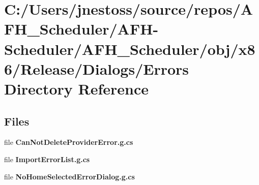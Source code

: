 \section{C\+:/\+Users/jnestoss/source/repos/\+A\+F\+H\+\_\+\+Scheduler/\+A\+F\+H-\/\+Scheduler/\+A\+F\+H\+\_\+\+Scheduler/obj/x86/\+Release/\+Dialogs/\+Errors Directory Reference}
\label{dir_d0006afbde3499538ceac505500f3a83}
\subsection*{Files}
\begin{DoxyCompactItemize}
\item 
file \textbf{ Can\+Not\+Delete\+Provider\+Error.\+g.\+cs}
\item 
file \textbf{ Import\+Error\+List.\+g.\+cs}
\item 
file \textbf{ No\+Home\+Selected\+Error\+Dialog.\+g.\+cs}
\end{DoxyCompactItemize}

